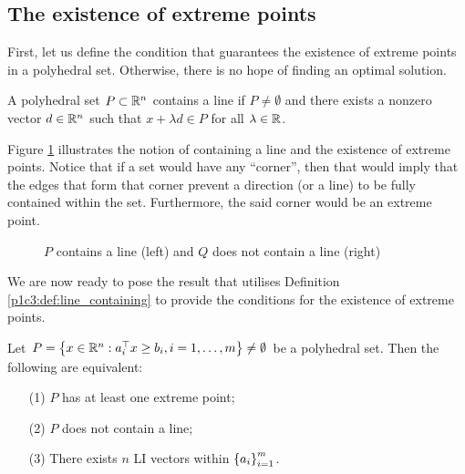 \subsection{The existence of extreme points}

First, let us define the condition that guarantees the existence of extreme points in a polyhedral set. Otherwise, there is no hope of finding an optimal solution.

\begin{definition}\label{p1c3:def:line_containing}
	A polyhedral set $P \subset \mathbb{R}^n$ contains a line if $P \neq \emptyset$ and there exists a nonzero vector $d \in \mathbb{R}^n$ such that $x + \lambda d \in P$ for all $\lambda \in \mathbb{R}$.
\end{definition}

Figure \ref{p1c3:fig:line_containing} illustrates the notion of containing a line and the existence of extreme points. Notice that if a set would have any ``corner'', then that would imply that the edges that form that corner prevent a direction (or a line) to be fully contained within the set. Furthermore, the said corner would be an extreme point.

\begin{figure}[h]
	\caption{$P$ contains a line (left) and $Q$ does not contain a line (right)} \label{p1c3:fig:line_containing}	
\end{figure}

We are now ready to pose the result that utilises Definition \ref{p1c3:def:line_containing} to provide the conditions for the existence of extreme points.

\begin{theorem}\label{p1c3:thm:exist_extreme_point}
	Let $P = \left\{ x \in \mathbb{R}^n : a_i^\top x \geq b_i, i = 1, \dots, m \right \} \neq \emptyset$ be a polyhedral set. Then the following are equivalent:
	\begin{enumerate}
		\item[(1)] $P$ has at least one extreme point;
		\item[(2)] $P$ does not contain a line;
		\item[(3)] There exists $n$ LI vectors within $\left\{ a_i \right \}_{i=1}^m$.	
	\end{enumerate}	
\end{theorem}	 

